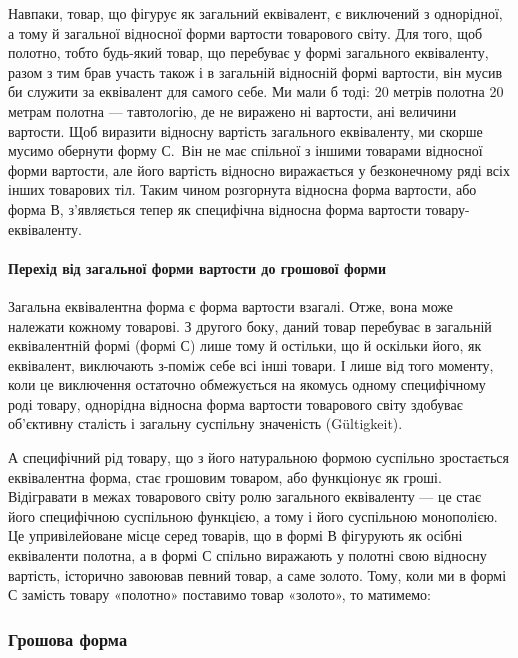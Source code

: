 Навпаки, товар, що фігурує як загальний еквівалент, є виключений
з однорідної, а тому й загальної відносної форми вартости
товарового світу. Для того, щоб полотно, тобто будь-який
товар, що перебуває у формі загального еквіваленту, разом з тим
брав участь також і в загальній відносній формі вартости, він
мусив би служити за еквівалент для самого себе. Ми мали б тоді:
20 метрів полотна \deq{} 20 метрам полотна — тавтологію, де не виражено
ні вартости, ані величини вартости. Щоб виразити відносну
вартість загального еквіваленту, ми скорше мусимо обернути
форму С.~Він не має спільної з іншими товарами відносної
форми вартости, але його вартість відносно виражається у безконечному
ряді всіх інших товарових тіл. Таким чином розгорнута
відносна форма вартости, або форма В, з’являється тепер
як специфічна відносна форма вартости товару-еквіваленту.

\paragraph{Перехід від загальної форми вартости до грошової форми}

Загальна еквівалентна форма є форма вартости взагалі. Отже,
вона може належати кожному товарові. З другого боку, даний
товар перебуває в загальній еквівалентній формі (формі С) лише
тому й остільки, що й оскільки його, як еквівалент, виключають
з-поміж себе всі інші товари. І лише від того моменту, коли це
виключення остаточно обмежується на якомусь одному специфічному
роді товару, однорідна відносна форма вартости товарового
світу здобуває об’єктивну сталість і загальну суспільну значеність
(Gültigkeit).

А специфічний рід товару, що з його натуральною формою
суспільно зростається еквівалентна форма, стає грошовим товаром,
або функціонує як гроші. Відігравати в межах товарового
світу ролю загального еквіваленту — це стає його специфічною
суспільною функцією, а тому і його суспільною монополією. Це
упривілейоване місце серед товарів, що в формі В фігурують як
осібні еквіваленти полотна, а в формі С спільно виражають у
полотні свою відносну вартість, історично завоював певний товар,
а саме золото. Тому, коли ми в формі С замість товару
«полотно» поставимо товар «золото», то матимемо:

\subsubsection{Грошова форма}

